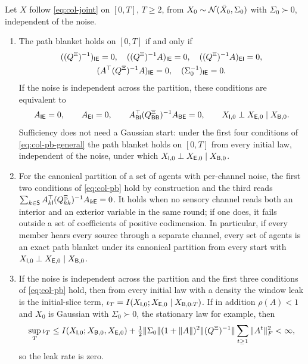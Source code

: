 \begin{theorem}\label{thm:col-path-blanket}
Let $X$ follow \eqref{eq:col-joint} on $[0,T]$, $T\ge2$, from $X_0\sim\mathcal{N}(\bar X_0,\Sigma_0)$ with $\Sigma_0\succ0$, independent of the noise.
\begin{enumerate}
\item[(a)] The path blanket holds on $[0,T]$ if and only if
\begin{equation}\label{eq:col-pb-general}
\begin{gathered}
((Q^{\Xi})^{-1})_{\mathsf{I}\mathsf{E}}=0,\quad((Q^{\Xi})^{-1}A)_{\mathsf{I}\mathsf{E}}=0,\quad((Q^{\Xi})^{-1}A)_{\mathsf{E}\mathsf{I}}=0,\\
(A^\top(Q^{\Xi})^{-1}A)_{\mathsf{I}\mathsf{E}}=0,\quad(\Sigma_0^{-1})_{\mathsf{I}\mathsf{E}}=0.
\end{gathered}
\end{equation}
If the noise is independent across the partition, these conditions are equivalent to
\begin{equation}\label{eq:col-pb}
A_{\mathsf{I}\mathsf{E}}=0,\qquad A_{\mathsf{E}\mathsf{I}}=0,\qquad A_{\mathsf{B}\mathsf{I}}^\top(Q^{\Xi}_{\mathsf{B}\mathsf{B}})^{-1}A_{\mathsf{B}\mathsf{E}}=0,\qquad X_{\mathsf{I},0}\perp X_{\mathsf{E},0}\mid X_{\mathsf{B},0}.
\end{equation}
Sufficiency does not need a Gaussian start: under the first four conditions of \eqref{eq:col-pb-general} the path blanket holds on $[0,T]$ from every initial law, independent of the noise, under which $X_{\mathsf{I},0}\perp X_{\mathsf{E},0}\mid X_{\mathsf{B},0}$.
\item[(b)] For the canonical partition of a set of agents with per-channel noise, the first two conditions of \eqref{eq:col-pb} hold by construction and the third reads $\sum_{k\in\mathsf{S}}A_{k\mathsf{I}}^\top(Q^{\Xi}_{kk})^{-1}A_{k\mathsf{E}}=0$. It holds when no sensory channel reads both an interior and an exterior variable in the same round; if one does, it fails outside a set of coefficients of positive codimension. In particular, if every member hears every source through a separate channel, every set of agents is an exact path blanket under its canonical partition from every start with $X_{\mathsf{I},0}\perp X_{\mathsf{E},0}\mid X_{\mathsf{B},0}$.
\item[(c)] If the noise is independent across the partition and the first three conditions of \eqref{eq:col-pb} hold, then from every initial law with a density the window leak is the initial-slice term, $\iota_T=I(X_{\mathsf{I},0};X_{\mathsf{E},0}\mid X_{\mathsf{B},0:T})$. If in addition $\rho(A)<1$ and $X_0$ is Gaussian with $\Sigma_0\succ0$, the stationary law for example, then
\begin{equation}\label{eq:col-initial-slice}
\sup_T\iota_T\le I(X_{\mathsf{I},0};X_{\mathsf{B},0},X_{\mathsf{E},0})+\tfrac12\Vert\Sigma_0\Vert(1+\Vert A\Vert)^2\Vert(Q^{\Xi})^{-1}\Vert\sum_{t\ge1}\Vert A^t\Vert_F^2<\infty,
\end{equation}
so the leak rate is zero.
\end{enumerate}
\end{theorem}
